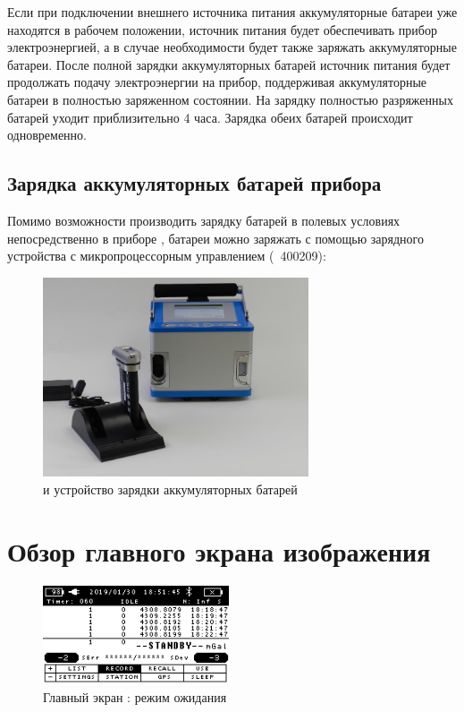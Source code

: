 Если при подключении внешнего источника питания аккумуляторные батареи уже
находятся в рабочем положении, источник питания будет обеспечивать прибор
электроэнергией, а в случае необходимости будет также заряжать аккумуляторные
батареи. После полной зарядки аккумуляторных батарей источник питания будет
продолжать подачу электроэнергии на прибор, поддерживая аккумуляторные батареи в
полностью заряженном состоянии. На зарядку полностью разряженных батарей уходит
приблизительно 4 часа. Зарядка обеих батарей происходит одновременно.


\subsection[Зарядка аккумуляторных батарей]{Зарядка аккумуляторных батарей прибора \cg{}}

Помимо возможности производить зарядку батарей в полевых условиях
непосредственно в приборе \cg, батареи можно заряжать с помощью
зарядного устройства с микропроцессорным управлением (\textnumero{}~400209):

\begin{figure}[h]
  \centering
  \includegraphics[width=0.7\textwidth]{figures/the_cg6_autograv_gravity_meter_and_the_battery_charger}
  \caption{\cg{} и устройство зарядки аккумуляторных батарей}
  \label{fig:the_cg6_autograv_gravity_meter_and_the_battery_charger}
\end{figure}

\section{Обзор главного экрана изображения}

\begin{figure}[h]
  \centering
  \includegraphics[width=0.49\textwidth]{figures/cg6_autograv_main_screen_idle_mode}
  \caption{Главный экран \cg{}: режим ожидания}
  \label{fig:cg6_autograv_main_screen_idle_mode}
\end{figure}

